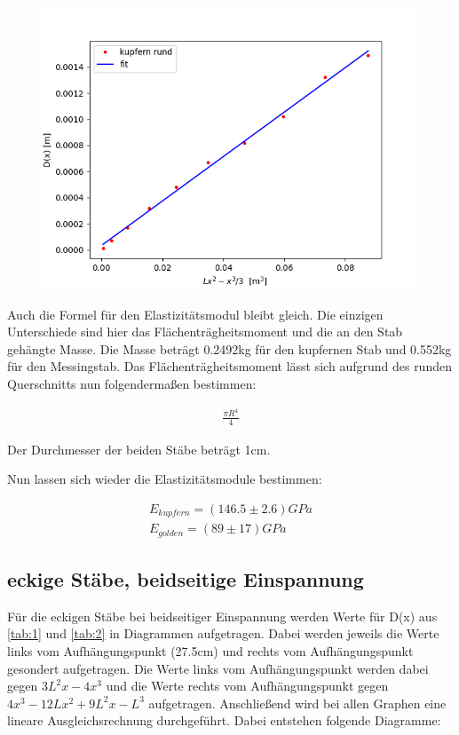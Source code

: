 \begin{figure}[H]
    \centering
    \includegraphics{kre.png}
\end{figure}

Auch die Formel für den Elastizitätsmodul bleibt gleich. Die einzigen Unterschiede sind hier das Flächenträgheitsmoment und die an den Stab gehängte Masse. Die Masse beträgt 0.2492kg für den kupfernen Stab und 0.552kg für den Messingstab. Das Flächenträgheitsmoment lässt sich aufgrund des runden Querschnitts nun folgendermaßen bestimmen:

\begin{align*}
    \frac{\pi R^4}{4}
\end{align*}

Der Durchmesser der beiden Stäbe beträgt 1cm.

Nun lassen sich wieder die Elastizitätsmodule bestimmen:

\begin{align*}
    E_{kupfern} = (146.5\pm 2.6) GPa \\
    E_{golden} = (89\pm 17) GPa 
\end{align*}

\subsection{eckige Stäbe, beidseitige Einspannung}

Für die eckigen Stäbe bei beidseitiger Einspannung werden Werte für D(x) aus \ref{tab:1} und \ref{tab:2} in Diagrammen aufgetragen. Dabei werden jeweils die Werte links vom Aufhängungspunkt (27.5cm) und rechts vom Aufhängungspunkt gesondert aufgetragen. Die Werte links vom Aufhängungspunkt werden dabei gegen $3L^2x-4x^3$ und die Werte rechts vom Aufhängungspunkt gegen $4x^3-12Lx^2+9L^2x-L^3$ aufgetragen. Anschließend wird bei allen Graphen eine lineare Ausgleichsrechnung durchgeführt. Dabei entstehen folgende Diagramme:

